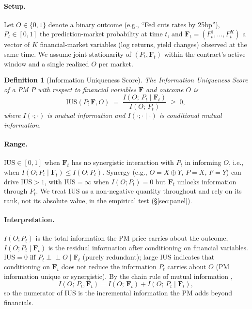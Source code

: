 \documentclass{article}
\providecommand{\indep}{\perp\!\!\!\perp}
\newtheorem{definition}{Definition}
\begin{document}
\paragraph{Setup.}
Let $O \in \{0, 1\}$ denote a binary outcome (e.g., ``Fed cuts rates by 25bp''), $P_t \in [0,1]$ the prediction-market probability at time $t$, and $\mathbf{F}_t = (F_t^1, \ldots, F_t^K)$ a vector of $K$ financial-market variables (log returns, yield changes) observed at the same time. We assume joint stationarity of $(P_t, \mathbf{F}_t)$ within the contract's active window and a single realized $O$ per market.

\begin{definition}[Information Uniqueness Score]
\label{def:ius}
The Information Uniqueness Score of a PM $P$ with respect to financial variables $\mathbf{F}$ and outcome $O$ is
\begin{equation}
\mathrm{IUS}(P; \mathbf{F}, O) \;=\; \frac{I(O;\, P_t \mid \mathbf{F}_t)}{I(O;\, P_t)} \;\ge\; 0,
\label{eq:ius}
\end{equation}
where $I(\cdot;\cdot)$ is mutual information and $I(\cdot;\cdot \mid \cdot)$ is conditional mutual information.
\end{definition}

\paragraph{Range.}
$\mathrm{IUS} \in [0, 1]$ when $\mathbf{F}_t$ has no synergistic interaction with $P_t$ in informing $O$, i.e., when $I(O; P_t \mid \mathbf{F}_t) \le I(O; P_t)$. Synergy (e.g., $O = X \oplus Y$, $P = X$, $F = Y$) can drive $\mathrm{IUS} > 1$, with $\mathrm{IUS} = \infty$ when $I(O; P_t) = 0$ but $\mathbf{F}_t$ unlocks information through $P_t$. We treat $\mathrm{IUS}$ as a non-negative quantity throughout and rely on its rank, not its absolute value, in the empirical test (\S\ref{sec:panel}).

\paragraph{Interpretation.}
$I(O;P_t)$ is the total information the PM price carries about the outcome; $I(O;P_t \mid \mathbf{F}_t)$ is the residual information after conditioning on financial variables. $\mathrm{IUS} = 0$ iff $P_t \indep O \mid \mathbf{F}_t$ (purely redundant); large $\mathrm{IUS}$ indicates that conditioning on $\mathbf{F}_t$ does not reduce the information $P_t$ carries about $O$ (PM information unique or synergistic). By the chain rule of mutual information \citep{cover2006elements},
\begin{equation}
I(O;\, P_t, \mathbf{F}_t) = I(O;\, \mathbf{F}_t) + I(O;\, P_t \mid \mathbf{F}_t),
\end{equation}
so the numerator of IUS is the incremental information the PM adds beyond financials.
\end{document}
